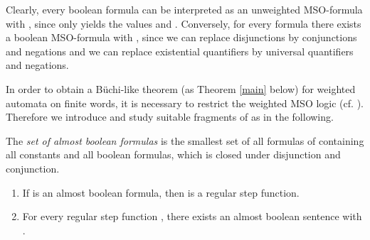 \documentclass[runningheads, envcountsame, a4paper]{llncs}
\begin{document}
\par
Clearly, every boolean formula  can be interpreted as an unweighted MSO-formula  with , since  only yields the values  and .
Conversely, for every formula  there exists a boolean MSO-formula  with , since we can replace disjunctions by conjunctions and negations and we can replace existential quantifiers by universal quantifiers and negations.
\par
In order to obtain a B\"uchi-like theorem (as Theorem \ref{main} below) for weighted automata on finite words, it is necessary to restrict the weighted MSO logic (cf. \cite{DG}). Therefore we introduce and study suitable fragments of  as in the following.
\begin{Def}
	The \emph{set of almost boolean formulas} is the smallest set of all formulas of  containing all constants  and all boolean formulas, which is closed under disjunction and conjunction.
\end{Def}
\begin{Satz}
	\label{almboolrsf}\begin{enumerate}[\quad (a)]
	\item If  is an almost boolean formula, then  is a regular step function.
	\item For every regular step function , there exists an almost boolean sentence  with .
	\end{enumerate}
\end{Satz}
\end{document}
